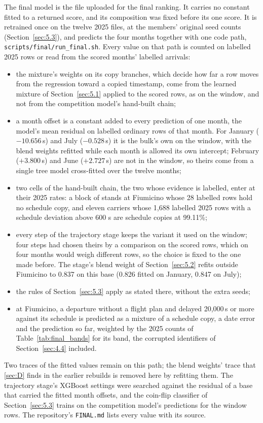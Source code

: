 \documentclass[
  manuscript=article,
  layout=preprint,
  year=2026,
  volume=x,
]{extra/joas}
\begin{document}
The final model is the file uploaded for the final ranking. It carries no constant fitted to a returned score, and its composition was fixed before its one score. It is retrained once on the twelve 2025 files, at the members' original seed counts (Section~\ref{sec:5.3}), and predicts the four months together with one code path, \texttt{scripts/final/run\_final.sh}. Every value on that path is counted on labelled 2025 rows or read from the scored months' labelled arrivals:
\begin{itemize}
\item the mixture's weights on its copy branches, which decide how far a row moves from the regression toward a copied timestamp, come from the learned mixture of Section~\ref{sec:5.1} applied to the scored rows, as on the window, and not from the competition model's hand-built chain;
\item a month offset is a constant added to every prediction of one month, the model's mean residual on labelled ordinary rows of that month. For January ($-10.656$\,s) and July ($-0.528$\,s) it is the bulk's own on the window, with the blend weights refitted while each month is allowed its own intercept; February ($+3.800$\,s) and June ($+2.727$\,s) are not in the window, so theirs come from a single tree model cross-fitted over the twelve months;
\item two cells of the hand-built chain, the two whose evidence is labelled, enter at their 2025 rates: a block of stands at Fiumicino whose 28 labelled rows hold no schedule copy, and eleven carriers whose 1,688 labelled 2025 rows with a schedule deviation above 600 s are schedule copies at 99.11\%;
\item every step of the trajectory stage keeps the variant it used on the window; four steps had chosen theirs by a comparison on the scored rows, which on four months would weigh different rows, so the choice is fixed to the one made before. The stage's blend weight of Section~\ref{sec:5.2} refits outside Fiumicino to 0.837 on this base (0.826 fitted on January, 0.847 on July);
\item the rules of Section~\ref{sec:5.3} apply as stated there, without the extra seeds;
\item at Fiumicino, a departure without a flight plan and delayed 20,000\,s or more against its schedule is predicted as a mixture of a schedule copy, a date error and the prediction so far, weighted by the 2025 counts of Table~\ref{tab:final_bands} for its band, the corrupted identifiers of Section~\ref{sec:4.4} included.
\end{itemize}
Two traces of the fitted values remain on this path; the blend weights' trace that \ref{sec:D} finds in the earlier rebuilds is removed here by refitting them. The trajectory stage's XGBoost settings were searched against the residual of a base that carried the fitted month offsets, and the coin-flip classifier of Section~\ref{sec:5.3} trains on the competition model's predictions for the window rows. The repository's \texttt{FINAL.md} lists every value with its source.
\end{document}
